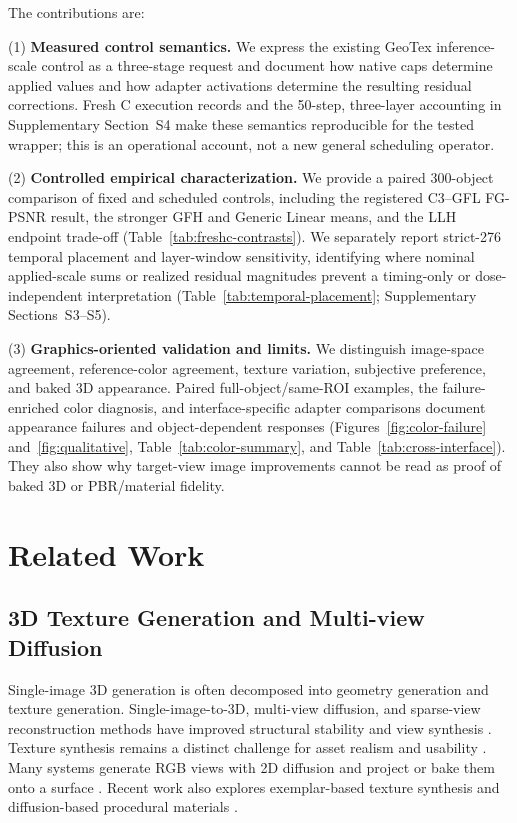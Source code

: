 \documentclass[times,twocolumn,final]{elsarticle}
\begin{document}
The contributions are:

(1) \textbf{Measured control semantics.} We express the existing GeoTex inference-scale control as a three-stage request and document how native caps determine applied values and how adapter activations determine the resulting residual corrections. Fresh C execution records and the 50-step, three-layer accounting in Supplementary Section~S4 make these semantics reproducible for the tested wrapper; this is an operational account, not a new general scheduling operator.

(2) \textbf{Controlled empirical characterization.} We provide a paired 300-object comparison of fixed and scheduled controls, including the registered C3--GFL FG-PSNR result, the stronger GFH and Generic Linear means, and the LLH endpoint trade-off (Table~\ref{tab:freshc-contrasts}). We separately report strict-276 temporal placement and layer-window sensitivity, identifying where nominal applied-scale sums or realized residual magnitudes prevent a timing-only or dose-independent interpretation (Table~\ref{tab:temporal-placement}; Supplementary Sections~S3--S5).

(3) \textbf{Graphics-oriented validation and limits.} We distinguish image-space agreement, reference-color agreement, texture variation, subjective preference, and baked 3D appearance. Paired full-object/same-ROI examples, the failure-enriched color diagnosis, and interface-specific adapter comparisons document appearance failures and object-dependent responses (Figures~\ref{fig:color-failure} and~\ref{fig:qualitative}, Table~\ref{tab:color-summary}, and Table~\ref{tab:cross-interface}). They also show why target-view image improvements cannot be read as proof of baked 3D or PBR/material fidelity.

\section{Related Work}
\label{sec:related}

\subsection{3D Texture Generation and Multi-view Diffusion}
\label{subsec:3dtex}

Single-image 3D generation is often decomposed into geometry generation and texture generation. Single-image-to-3D, multi-view diffusion, and sparse-view reconstruction methods have improved structural stability and view synthesis \cite{liu2023zero1to3,shi2023zero123pp,liu2023syncdreamer,long2023wonder3d,shi2024mvdream,wang2023imagedream,xu2024instantmesh,ke2024era3d}. Texture synthesis remains a distinct challenge for asset realism and usability \cite{perla2026survey}. Many systems generate RGB views with 2D diffusion and project or bake them onto a surface \cite{chen2023text2tex,richardson2023texture,poole2023dreamfusion,chen2023fantasia3d}. Recent work also explores exemplar-based texture synthesis and diffusion-based procedural materials \cite{guzman2026adaptive,lv2025interpretable}.
\end{document}
